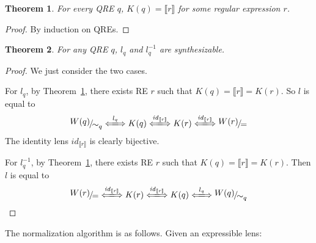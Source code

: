 \documentclass[a4paper,11pt] {article}
\theoremstyle{plain}
\newtheorem{theorem}{Theorem}[section]
\newcommand{\lensbetween}[1]{\xLongleftrightarrow{#1}}
\newcommand{\niceFrac}[2]{%
    \raise.5ex\hbox{$#1$}%
    \kern-.1em/\kern-.15em%
    \lower.25ex\hbox{$#2$}}
\begin{document}
\begin{theorem}
  \label{thm:kernel-rep}
  For every QRE $q$, $K(q) = \llbracket r \rrbracket$ for some
  regular expression $r$.
\end{theorem}
\begin{proof}
  By induction on QREs.
\end{proof}

\begin{theorem}
  \label{thm:basic-qre-syn}
  For any QRE $q$, $l_q$ and $l_q^{-1}$ are synthesizable.
\end{theorem}
\begin{proof}
  We just consider the two cases.

  For $l_q$, by Theorem~\ref{thm:kernel-rep},
  there exists RE $r$ such that
  $K(q) = \llbracket r \rrbracket = K(r)$.
  So $l$ is equal to 
  \begin{align*}
    \niceFrac{W(q)}{\sim_{q}} \lensbetween{l_q}
    K(q) \lensbetween{\mathit{id}_{\llbracket r \rrbracket}} K(r)
    \lensbetween{\mathit{id}_{\llbracket r \rrbracket}}
    \niceFrac{W(r)}{=}
  \end{align*}
  The identity lens $\mathit{id}_{\llbracket r \rrbracket}$ is
  clearly bijective.
  
  For $l_q^{-1}$, by Theorem~\ref{thm:kernel-rep},
  there exists RE $r$ such that
  $K(q) = \llbracket r \rrbracket = K(r)$.
  Then $l$ is equal to 
  \begin{align*}
    \niceFrac{W(r)}{=}
    \lensbetween{\mathit{id}_{\llbracket r \rrbracket}} K(r)
    \lensbetween{\mathit{id}_{\llbracket r \rrbracket}}
    K(q) \lensbetween{l_q} \niceFrac{W(q)}{\sim_q}
  \end{align*}
\end{proof}
The normalization algorithm is as follows. Given an expressible lens:
\end{document}
